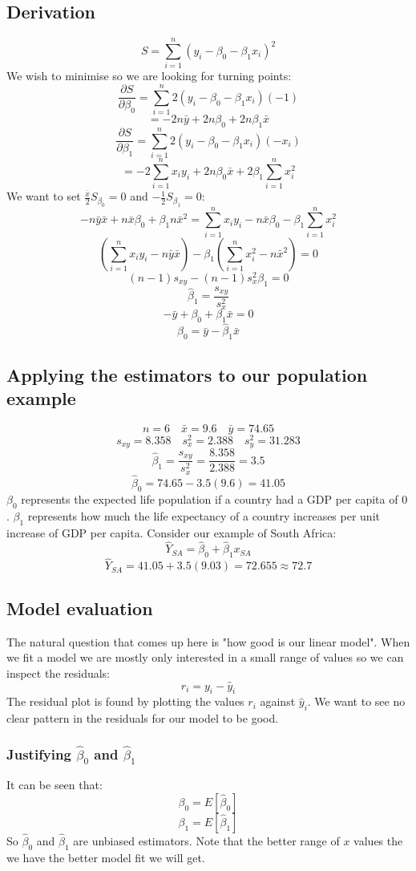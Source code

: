 \documentclass[12pt]{article}
\begin{document}
\subsection*{Derivation}
\[S=\sum^n_{i=1}(y_i-\beta_0-\beta_1x_i)^2\]
We wish to minimise so we are looking for turning points:
\[\frac{\partial S}{\partial \beta_0}=\sum^n_{i=1}2(y_i-\beta_0-\beta_1x_i)(-1)\]
\[=-2n\bar{y}+2n\beta_0+2n\beta_1\bar{x}\]
\[\frac{\partial S}{\partial\beta_1}=\sum^n_{i=1}2(y_i-\beta_0-\beta_1x_i)(-x_i)\]
\[=-2\sum^n_{i=1}x_iy_i+2n\beta_0\bar{x}+2\beta_1\sum^n_{i=1}x_i^2\]
We want to set \(\frac{\bar{x}}{2}S_{\beta_0}=0\) and \(-\frac{1}{2}S_{\beta_1}=0\):
\[-n\bar{y}\bar{x}+n\bar{x}\beta_0+\beta_1n\bar{x}^2=\sum^n_{i=1}x_iy_i-n\bar{x}\beta_0-\beta_1\sum^n_{i=1}x_i^2\]
\[\left(\sum^n_{i=1}x_iy_i-n\bar{y}\bar{x}\right)-\beta_1\left(\sum^n_{i=1}x_i^2-n\bar{x}^2\right)=0\]
\[(n-1)s_{xy}-(n-1)s_x^2\beta_1=0\]
\[\hat{\beta}_1=\frac{s_{xy}}{s_x^2}\]
\[-\bar{y}+\beta_0+\beta_1\bar{x}=0\]
\[\hat{\beta}_0=\bar{y}-\hat{\beta}_1\bar{x}\]
\subsection*{Applying the estimators to our population example}
\[n=6\quad\bar{x}=9.6\quad \bar{y}=74.65\]
\[s_{xy}=8.358\quad s_x^2=2.388 \quad s_y^2=31.283\]
\[\hat{\beta}_1=\frac{s_{xy}}{s_{x}^2}=\frac{8.358}{2.388}=3.5\]
\[\hat{\beta}_0=74.65-3.5(9.6)=41.05\]
\(\beta_0\) represents the expected life population if a country had a GDP per capita of \(0\). \(\beta_1\) represents how much the life expectancy of a country increases per unit increase of GDP per capita. Consider our example of South Africa:
\[\hat{Y}_{SA}=\hat{\beta}_0+\hat{\beta}_1x_{SA}\]
\[\hat{Y}_{SA}=41.05+3.5(9.03)=72.655\approx72.7\]
\subsection*{Model evaluation}
The natural question that comes up here is "how good is our linear model". When we fit a model we are mostly only interested in a small range of values so we can inspect the residuals:
\[r_i=y_i-\hat{y}_i\]
The residual plot is found by plotting the values \(r_i\) against \(\hat{y}_i\). We want to see no clear pattern in the residuals for our model to be good.
\subsubsection*{Justifying \(\hat{\beta}_0\) and \(\hat{\beta}_1\)}
It can be seen that:
\[\beta_0=E[\hat{\beta}_0]\]
\[\beta_1=E[\hat{\beta}_1]\]
So \(\hat{\beta}_0\) and \(\hat{\beta}_1\) are unbiased estimators. Note that the better range of \(x\) values the we have the better model fit we will get.
\end{document}

